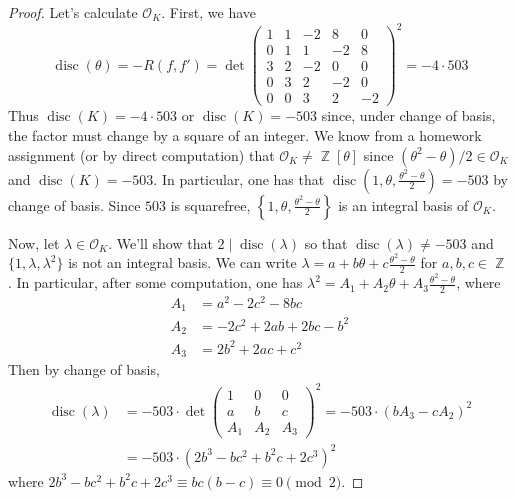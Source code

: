\documentclass[11pt, a4paper]{memoir}
\DeclareMathOperator{\Z}{{\mathbb{Z}}}
\theoremstyle{change}
\theoremstyle{plain}
\theoremstyle{nonumberplain}
\newtheorem{proof}{Proof}
\DeclareMathOperator{\disc}{disc}
\numberwithin{equation}{section}
\begin{document}
\begin{proof}
    Let's calculate $\mathcal{O}_K$.
    First, we have
    \begin{equation*}
        \disc(\theta)=-R(f,f')=
        \det
        \begin{pmatrix}
            1&1&-2&8&0\\
            0&1&1&-2&8\\
            3&2&-2&0&0\\
            0&3&2&-2&0\\
            0&0&3&2&-2
        \end{pmatrix}^2
        =-4\cdot 503
    \end{equation*}
    Thus $\disc(K)=-4\cdot 503$ or $\disc(K)=-503$ since, under change of basis, the factor must change by a square of an integer.
    We know from a homework assignment (or by direct computation) that $\mathcal{O}_K\neq\Z[\theta]$ since $(\theta^2-\theta)/2\in\mathcal{O}_K$ and $\disc(K)=-503$.
    In particular, one has that $\disc(1,\theta,\frac{\theta^2-\theta}{2})=-503$ by change of basis.
    Since $503$ is squarefree, $\left\{1,\theta,\frac{\theta^2-\theta}{2}\right\}$ is an integral basis of $\mathcal{O}_K$.

    Now, let $\lambda\in\mathcal{O}_K$.
    We'll show that $2\mid\disc(\lambda)$ so that $\disc(\lambda)\neq -503$ and $\{1,\lambda,\lambda^2\}$ is not an integral basis.
    We can write $\lambda=a+b\theta+c\frac{\theta^2-\theta}{2}$ for $a,b,c\in\Z$.
    In particular, after some computation, one has $\lambda^2=A_1+A_2\theta+A_3\frac{\theta^2-\theta}{2}$, where
    \begin{align*}
        A_1&=a^2-2c^2-8bc\\
        A_2&=-2c^2+2ab+2bc-b^2\\
        A_3&= 2b^2+2ac+c^2
    \end{align*}
    Then by change of basis,
    \begin{align*}
        \disc(\lambda)&=-503\cdot\det
        \begin{pmatrix}
            1&0&0\\
            a&b&c\\
            A_1&A_2&A_3
        \end{pmatrix}^2
        = -503\cdot (bA_3-cA_2)^2\\
        &=-503\cdot(2b^3-bc^2+b^2c+2c^3)^2
    \end{align*}
    where $2b^3-bc^2+b^2c+2c^3\equiv bc(b-c)\equiv 0\pmod{2}$.
\end{proof}
\end{document}
